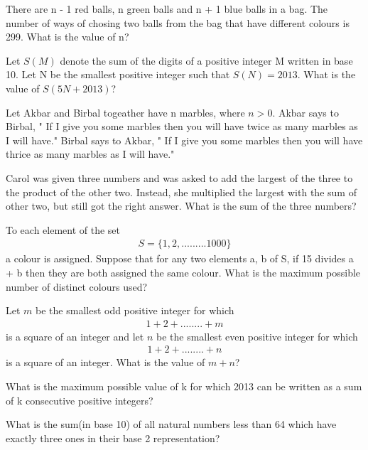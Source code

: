 \item There are  n - 1 red balls, n green balls and n + 1 blue balls in a bag. The number of ways of chosing two balls from the bag that have different colours is 299. What is the value of n?

\item Let $S(M)$ denote the sum of the digits of a positive integer M written in base 10. Let N be the smallest positive integer such that $S(N) = 2013$. What is the value of $S(5N + 2013)$?

\item Let Akbar and Birbal togeather have n marbles, where $n > 0$. Akbar says to Birbal, " If I give you some marbles then you will have twice as many marbles as I will have." Birbal says to Akbar, " If I give you some marbles then you will have thrice as many marbles as I will have."

\item Carol was given three numbers and was asked to add the largest of the three to the product of the other two. Instead, she multiplied the largest with the sum of other two, but still got the right answer. What is the sum of the three numbers?

\item To each element of the set
\begin{align*}
S = \{1, 2,.........1000\}
\end{align*}
a colour is assigned. Suppose that for any two elements a, b of S, if 15 divides a + b then they are both assigned the same colour. What is the maximum possible number of distinct colours used?

\item Let $m$ be the smallest odd positive integer for which
\begin{align*}
1 + 2 +........+m
\end{align*}
is a square of an integer and let $n$ be the smallest even positive integer for which
\begin{align*}
1 + 2 +........+n 
\end{align*}
is a square of an integer. What is the value of $m + n$?

\item What is the maximum possible value of k for which 2013 can be written as a sum of k consecutive positive integers?

\item What is the sum(in base 10) of all natural numbers less than 64 which have exactly three ones in their base 2 representation?
